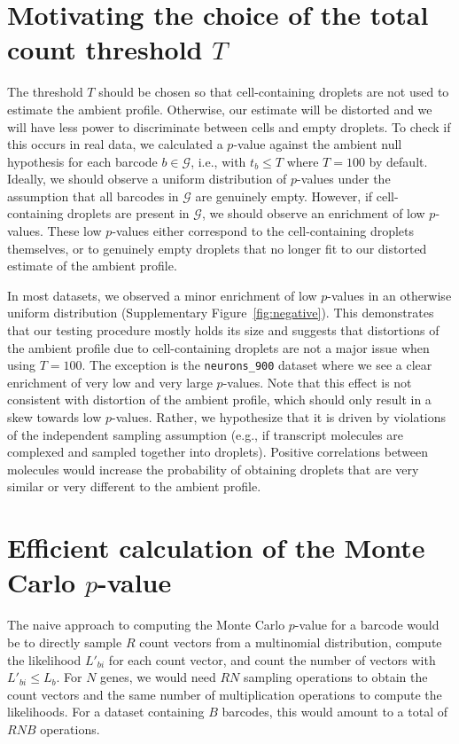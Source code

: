 \documentclass{article}
\newcommand{\code}[1]{\texttt{#1}}
\begin{document}
\section{Motivating the choice of the total count threshold $T$}
The threshold $T$ should be chosen so that cell-containing droplets are not used to estimate the ambient profile.
Otherwise, our estimate will be distorted and we will have less power to discriminate between cells and empty droplets.
To check if this occurs in real data, we calculated a $p$-value against the ambient null hypothesis for each barcode $b \in \mathcal{G}$, 
i.e., with $t_b \le T$ where $T = 100$ by default.
Ideally, we should observe a uniform distribution of $p$-values under the assumption that all barcodes in $\mathcal{G}$ are genuinely empty.
However, if cell-containing droplets are present in $\mathcal{G}$, we should observe an enrichment of low $p$-values.
These low $p$-values either correspond to the cell-containing droplets themselves,
or to genuinely empty droplets that no longer fit to our distorted estimate of the ambient profile.

In most datasets, we observed a minor enrichment of low $p$-values in an otherwise uniform distribution (Supplementary Figure~\ref{fig:negative}). 
This demonstrates that our testing procedure mostly holds its size and suggests that distortions of the ambient profile due to cell-containing droplets are not a major issue when using $T=100$.
The exception is the \code{neurons\_900} dataset where we see a clear enrichment of very low and very large $p$-values.
Note that  this effect is not consistent with distortion of the ambient profile, which should only result in a skew towards low $p$-values.
Rather, we hypothesize that it is driven by violations of the independent sampling assumption (e.g., if transcript molecules are complexed and sampled together into droplets).
Positive correlations between molecules would increase the probability of obtaining droplets that are very similar or very different to the ambient profile.

\section{Efficient calculation of the Monte Carlo $p$-value}
The naive approach to computing the Monte Carlo $p$-value for a barcode would be to directly sample $R$ count vectors from a multinomial distribution,
compute the likelihood $L'_{bi}$ for each count vector, and count the number of vectors with $L'_{bi} \le L_{b}$.
For $N$ genes, we would need $RN$ sampling operations to obtain the count vectors and the same number of multiplication operations to compute the likelihoods.
For a dataset containing $B$ barcodes, this would amount to a total of $RNB$ operations.
\end{document}
